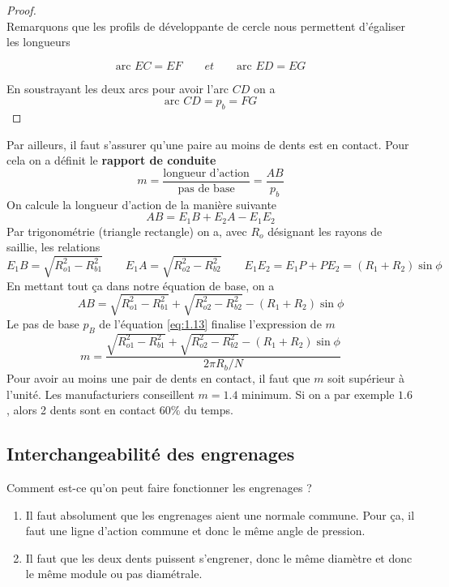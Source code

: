 \begin{proof} \ \\
	Remarquons que les profils de développante de cercle nous permettent d'égaliser les longueurs 
	
	\begin{equation}
		\mbox{arc } EC = EF \qquad et \qquad \mbox{arc } ED = EG
	\end{equation}				
			
	En soustrayant les deux arcs pour avoir l'arc $CD$ on a 
	\begin{equation}
		\mbox{arc } CD = p_b = FG
	\end{equation}				
\end{proof}
	
Par ailleurs, il faut s'assurer qu'une paire au moins de dents est en contact. Pour cela on a définit le \textbf{rapport de conduite}
\begin{equation}
	m = \frac{\mbox{longueur d'action}}{\mbox{pas de base}} = \frac{AB}{p_b}
\end{equation}
On calcule la longueur d'action de la manière suivante
\begin{equation}
	AB = E_1B + E_2A -E_1E_2
\end{equation}
Par trigonométrie (triangle rectangle) on a, avec $R_o$ désignant les rayons de saillie, les relations
\begin{equation}
	E_1B = \sqrt{R_{o1}^2-R_{b1}^2} \qquad E_1A = \sqrt{R_{o2}^2-R_{b2}^2} \qquad E_1E_2 = E_1P + PE_2 = (R_1 + R_2) \sin \phi
\end{equation}
En mettant tout ça dans notre équation de base, on a
\begin{equation}
	AB = \sqrt{R_{o1}^2-R_{b1}^2} + \sqrt{R_{o2}^2-R_{b2}^2} - (R_1 + R_2) \sin \phi
\end{equation}
Le pas de base $p_B$ de l'équation \autoref{eq:1.13} finalise l'expression de $m$
\begin{equation}
	m = \frac{\sqrt{R_{o1}^2-R_{b1}^2} + \sqrt{R_{o2}^2-R_{b2}^2} - (R_1 + R_2) \sin \phi}{2\pi R_b/N}
\end{equation}
Pour avoir au moins une pair de dents en contact, il faut que $m$ soit supérieur à l'unité. Les manufacturiers conseillent $m = 1.4$ minimum. Si on a par exemple $1.6$, alors 2 dents sont en contact $60 \%$ du temps.
		
\subsection{Interchangeabilité des engrenages}
Comment est-ce qu'on peut faire fonctionner les engrenages ? 
\begin{enumerate}
	\item Il faut absolument que les engrenages aient une normale commune. Pour ça, il faut une ligne d'action commune et donc le même angle de pression.
	      		
	\item Il faut que les deux dents puissent s'engrener, donc le même diamètre et donc le même module ou pas diamétrale. \\
\end{enumerate}		 

